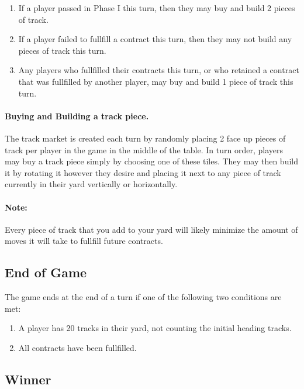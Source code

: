\documentclass[12pt, letterpaper]{article}
\begin{document}
\begin{enumerate}
\item If a player passed in Phase I this turn, then they may buy and build 2 pieces of track.
\item If a player failed to fullfill a contract this turn, then they may not build any pieces of track this turn.
\item Any players who fullfilled their contracts this turn, or who retained a contract that was fullfilled by another player, may buy and build 1 piece of track this turn.
\end{enumerate}

\paragraph{Buying and Building a track piece. }

The track market is created each turn by randomly placing 2 face up pieces of track per player in the game in the middle of the table. In turn order, players may buy a track piece simply by choosing one of these tiles. They may then build it by rotating it however they desire and placing it next to any piece of track currently in their yard vertically or horizontally.

\paragraph{Note: } Every piece of track that you add to your yard will likely minimize the amount of moves it will take to fullfill future contracts.

\subsection{End of Game}

The game ends at the end of a turn if one of the following two conditions are met:

\begin{enumerate}
\item A player has 20 tracks in their yard, not counting the initial heading tracks.
\item All contracts have been fullfilled.
\end{enumerate}

\subsection{Winner}
\end{document}
